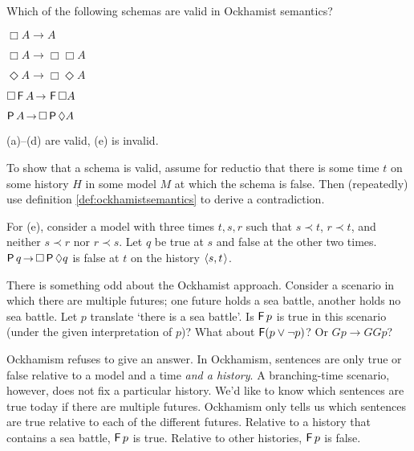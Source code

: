 \begin{exercise}
  Which of the following schemas are valid in Ockhamist semantics?
  \begin{exlist}
  \item $\Box A \to A$
  \item $\Box A \to \Box\Box A$
  \item $\Diamond A \to \Box\Diamond A$
  \item $\Box \tF A \to \tF\Box A$
  \item $\tP A \to \Box \tP \Diamond A$%
  \end{exlist}
\end{exercise}
\begin{solution}
  (a)--(d) are valid, (e) is invalid.

  To show that a schema is valid, assume for reductio that there is some time
  $t$ on some history $H$ in some model $M$ at which the schema is false. Then
  (repeatedly) use definition \ref{def:ockhamistsemantics} to derive a
  contradiction.

  For (e), consider a model with three times $t,s,r$ such that $s\prec t$,
  $r\prec t$, and neither $s \prec r$ nor $r\prec s$. Let $q$ be true at $s$ and
  false at the other two times. $\tP q \to \Box \tP \Diamond q$ is false at $t$
  on the history $\t{s,t}$.
\end{solution}

There is something odd about the Ockhamist approach. Consider a scenario in
which there are multiple futures; one future holds a sea battle, another holds
no sea battle. Let $p$ translate `there is a sea battle'. Is $\operatorname{\mathsf{F}} p$ is true in
this scenario (under the given interpretation of $p$)? What about
$\operatorname{\mathsf{F}}(p \lor \neg p)$? Or $Gp \to GGp$?

Ockhamism refuses to give an answer. In Ockhamism, sentences are only true or
false relative to a model and a time \emph{and a history}. A branching-time
scenario, however, does not fix a particular history. We'd like to know which
sentences are true today if there are multiple futures. Ockhamism only tells us
which sentences are true relative to each of the different futures. Relative to
a history that contains a sea battle, $\operatorname{\mathsf{F}} p$ is true. Relative to other
histories, $\operatorname{\mathsf{F}} p$ is false.


